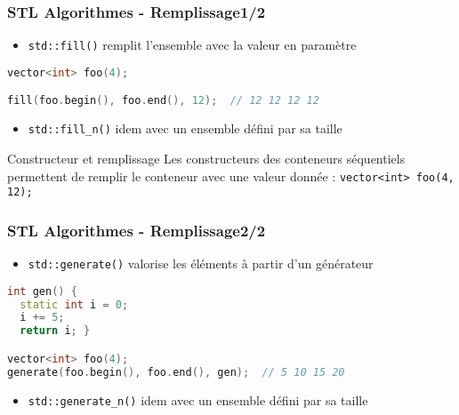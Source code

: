 \documentclass[C++.tex]{subfiles}
\begin{document}
\begin{frame}[fragile]
	\frametitle{STL Algorithmes - Remplissage\titlehfill{}1/2}
	\begin{itemize}
		\item \lstinline|std::fill()| remplit l'ensemble avec la valeur en paramètre
	\end{itemize}

	\begin{lstlisting}[language=C++]
vector<int> foo(4);

fill(foo.begin(), foo.end(), 12);  // 12 12 12 12\end{lstlisting}

	\begin{itemize}
		\item \lstinline|std::fill_n()| idem avec un ensemble défini par sa taille
	\end{itemize}

	\begin{block}{Constructeur et remplissage}
		Les constructeurs des conteneurs séquentiels permettent de remplir le conteneur avec une valeur donnée : \lstinline|vector<int> foo(4, 12);|
	\end{block}
\end{frame}

\begin{frame}[fragile]
	\frametitle{STL Algorithmes - Remplissage\titlehfill{}2/2}
	\begin{itemize}
		\item \lstinline|std::generate()| valorise les éléments à partir d'un générateur
	\end{itemize}

	\begin{lstlisting}[language=C++]
int gen() {
  static int i = 0;
  i += 5;
  return i; }

vector<int> foo(4);
generate(foo.begin(), foo.end(), gen);  // 5 10 15 20\end{lstlisting}

	\begin{itemize}
		\item \lstinline|std::generate_n()| idem avec un ensemble défini par sa taille
	\end{itemize}
\end{frame}
\end{document}

